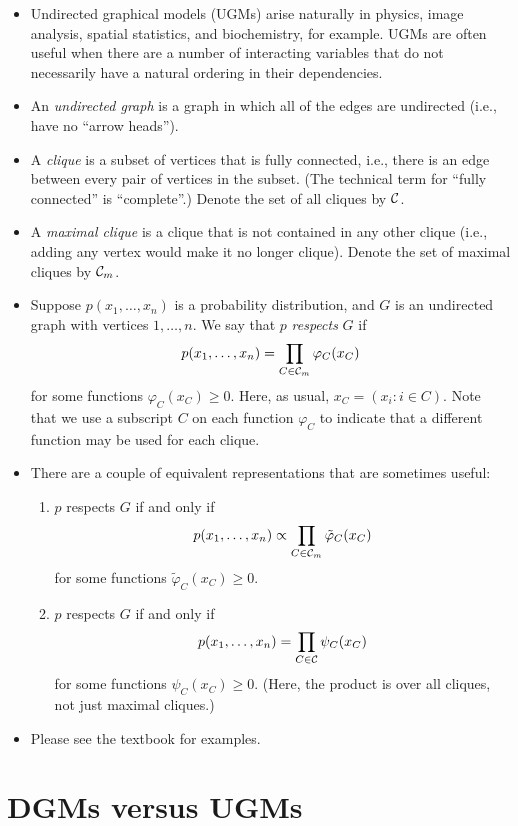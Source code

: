 \documentclass[12pt]{article}
\begin{document}
\begin{itemize}
\item Undirected graphical models (UGMs) arise naturally in physics, image analysis, spatial statistics, and biochemistry, for example. UGMs are often useful when there are a number of interacting variables that do not necessarily have a natural ordering in their dependencies.
\item An \textit{undirected graph} is a graph in which all of the edges are undirected (i.e., have no ``arrow heads'').
\item A \textit{clique} is a subset of vertices that is fully connected, i.e., there is an edge between every pair of vertices in the subset. (The technical term for ``fully connected'' is ``complete''.) Denote the set of all cliques by $\mathcal{C}$.
\item A \textit{maximal clique} is a clique that is not contained in any other clique (i.e., adding any vertex would make it no longer clique). Denote the set of maximal cliques by $\mathcal{C}_m$.
\item Suppose $p(x_1,\ldots,x_n)$ is a probability distribution, and $G$ is an undirected graph with vertices $1,\ldots,n$. We say that $p$ \textit{respects} $G$ if
$$ p(x_1,\ldots,x_n) = \prod_{C \in \mathcal{C}_m} \varphi_C(x_C) $$
for some functions $\varphi_C(x_C) \geq 0$. Here, as usual, $x_C = (x_i:i \in C)$. Note that we use a subscript $C$ on each function $\varphi_C$ to indicate that a different function may be used for each clique.
\item There are a couple of equivalent representations that are sometimes useful:
\begin{enumerate}
\item $p$ respects $G$ if and only if
$$ p(x_1,\ldots,x_n) \propto \prod_{C \in \mathcal{C}_m} \tilde\varphi_C(x_C) $$
for some functions $\tilde\varphi_C(x_C) \geq 0$.
\item $p$ respects $G$ if and only if
$$ p(x_1,\ldots,x_n) = \prod_{C \in \mathcal{C}} \psi_C(x_C) $$
for some functions $\psi_C(x_C) \geq 0$. (Here, the product is over all cliques, not just maximal cliques.)
\end{enumerate}
\item Please see the textbook for examples.
\end{itemize}


\section{DGMs versus UGMs}
\end{document}
